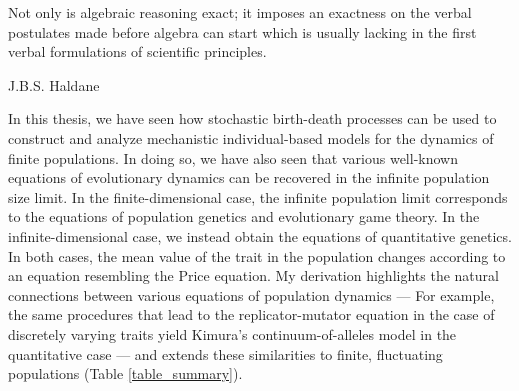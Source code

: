 \epigraph{\justifying Not only is algebraic reasoning exact; it imposes an exactness on the verbal postulates made before algebra can start which is usually lacking in the first verbal formulations of scientific principles.}{J.B.S. Haldane~\citep{haldane_defense_1964}}
\justifying
In this thesis, we have seen how stochastic birth-death processes can be used to construct and analyze mechanistic individual-based models for the dynamics of finite populations. In doing so, we have also seen that various well-known equations of evolutionary dynamics can be recovered in the infinite population size limit. In the finite-dimensional case, the infinite population limit corresponds to the equations of population genetics and evolutionary game theory. In the infinite-dimensional case, we instead obtain the equations of quantitative genetics. In both cases, the mean value of the trait in the population changes according to an equation resembling the Price equation. My derivation highlights the natural connections between various equations of population dynamics --- For example, the same procedures that lead to the replicator-mutator equation in the case of discretely varying traits yield Kimura's continuum-of-alleles model in the quantitative case --- and extends these similarities to finite, fluctuating populations (Table \ref{table_summary}).

